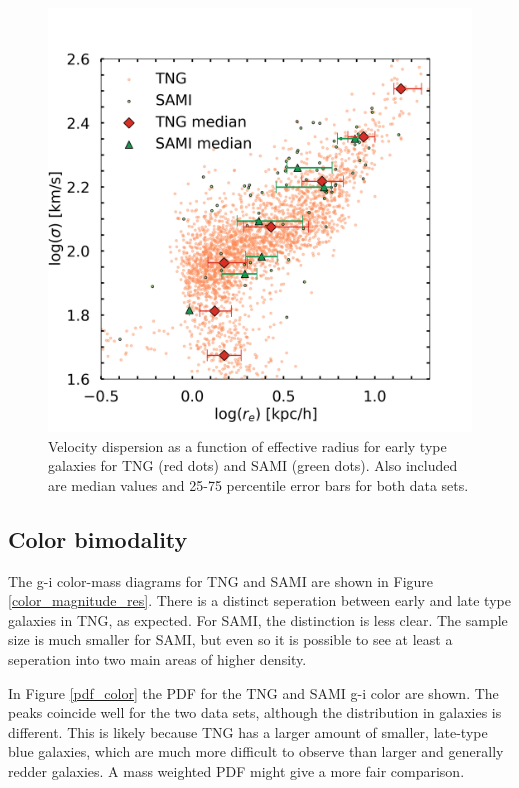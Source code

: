 \begin{figure}
    \centering
    \includegraphics[width=\textwidth]{images/results_sigma_radius_FP.png}
    \caption{Velocity dispersion as a function of effective radius for early type galaxies for TNG (red dots) and SAMI (green dots). Also included are median values and 25-75 percentile error bars for both data sets.}
    \label{FP_res2}
\end{figure}

\subsection{Color bimodality}
The g-i color-mass diagrams for TNG and SAMI are shown in Figure \ref{color_magnitude_res}. There is a distinct seperation between early and late type galaxies in TNG, as expected. For SAMI, the distinction is less clear. The sample size is much smaller for SAMI, but even so it is possible to see at least a seperation into two main areas of higher density.

In Figure \ref{pdf_color} the PDF for the TNG and SAMI g-i color are shown. The peaks coincide well for the two data sets, although the distribution in galaxies is different. This is likely because TNG has a larger amount of smaller, late-type blue galaxies, which are much more difficult to observe than larger and generally redder galaxies. A mass weighted PDF might give a more fair comparison.

